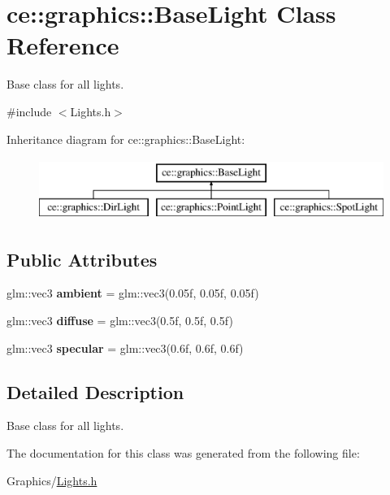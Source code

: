 \hypertarget{classce_1_1graphics_1_1_base_light}{}\section{ce\+:\+:graphics\+:\+:Base\+Light Class Reference}
\label{classce_1_1graphics_1_1_base_light}


Base class for all lights.  




{\ttfamily \#include $<$Lights.\+h$>$}

Inheritance diagram for ce\+:\+:graphics\+:\+:Base\+Light\+:\begin{figure}[H]
\begin{center}
\leavevmode
\includegraphics[height=2.000000cm]{classce_1_1graphics_1_1_base_light}
\end{center}
\end{figure}
\subsection*{Public Attributes}
\begin{DoxyCompactItemize}
\item 
\mbox{\label{classce_1_1graphics_1_1_base_light_ab7d381028fc562de3e35aaba218e0ef8}} 
glm\+::vec3 {\bfseries ambient} = glm\+::vec3(0.\+05f, 0.\+05f, 0.\+05f)
\item 
\mbox{\label{classce_1_1graphics_1_1_base_light_a4435de10ee05a5c96bce761b1148d96e}} 
glm\+::vec3 {\bfseries diffuse} = glm\+::vec3(0.\+5f, 0.\+5f, 0.\+5f)
\item 
\mbox{\label{classce_1_1graphics_1_1_base_light_a8aca51622639df6f87b276a9e791f0e5}} 
glm\+::vec3 {\bfseries specular} = glm\+::vec3(0.\+6f, 0.\+6f, 0.\+6f)
\end{DoxyCompactItemize}


\subsection{Detailed Description}
Base class for all lights. 

The documentation for this class was generated from the following file\+:\begin{DoxyCompactItemize}
\item 
Graphics/\hyperlink{_lights_8h}{Lights.\+h}\end{DoxyCompactItemize}
